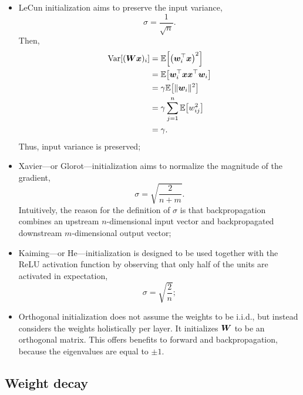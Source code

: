 \begin{itemize}
    \item LeCun initialization \citep{lecun2002efficient} aims to preserve the input variance, \[
              \sigma = \frac{1}{\sqrt{n}}.
          \]
          Then,
          \begin{align*}
              \Var[(\mat{W} \vec{x})_i] & = \E \lft[ \lft( \transpose{\vec{w}_i} \vec{x} \rgt)^2 \rgt]                 \\
                                        & = \E \lft[ \transpose{\vec{w}_i} \vec{x} \transpose{\vec{x}} \vec{w}_i \rgt] \\
                                        & = \gamma \E \lft[ \| \vec{w}_i \|^2 \rgt]                                    \\
                                        & = \gamma \sum_{j=1}^{n} \E\lft[w_{ij}^2\rgt]                                 \\
                                        & = \gamma.
          \end{align*}
          Thus, input variance is preserved;

    \item Xavier---or Glorot---initialization \citep{glorot2010understanding} aims to normalize the magnitude
          of the gradient, \[
              \sigma = \sqrt{\frac{2}{n+m}}.
          \]
          Intuitively, the reason for the definition of $\sigma$ is that backpropagation combines an upstream
          $n$-dimensional input vector and backpropagated downstream $m$-dimensional output vector;

    \item Kaiming---or He---initialization \citep{he2015delving} is designed to be used together with the
          ReLU activation function by observing that only half of the units are activated in expectation, \[
              \sigma = \sqrt{\frac{2}{n}};
          \]
    \item Orthogonal initialization \citep{saxe2013exact,hu2020provable} does not assume the weights to be
          i.i.d., but instead considers the weights holistically per layer. It initializes $\bm{W}$ to be an
          orthogonal matrix. This offers benefits to forward and backpropagation, because the eigenvalues are
          equal to $\pm 1$.
\end{itemize}

\subsection{Weight decay}


